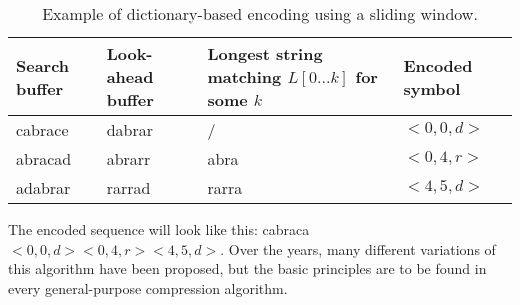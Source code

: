 \begin{table}[!htbp]
\centering
\begin{tabular}{p{1.5cm}|p{2.5cm}|p{3.5cm}|p{2cm}}
\textbf{Search buffer} & \textbf{Look-ahead buffer} & \textbf{Longest string} \newline \textbf{matching} $L[0...k]$ \newline \textbf{for some} $k$ & \textbf{Encoded symbol} \\
\hline
cabrace          & dabrar & /     & $<0, 0, d>$ \\                
abracad          & abrarr & abra  & $<0, 4, r>$ \\ 
adabrar          & rarrad & rarra & $<4, 5, d>$ \\               
\end{tabular}
\caption{Example of dictionary-based encoding using a sliding window.}
\label{tab:lz}
\end{table}

The encoded sequence will look like this: cabraca$<0,0,d><0, 4, r><4, 5, d>$.
Over the years, many different variations of this algorithm have been proposed,
but the basic principles are to be found in every general-purpose compression algorithm.
